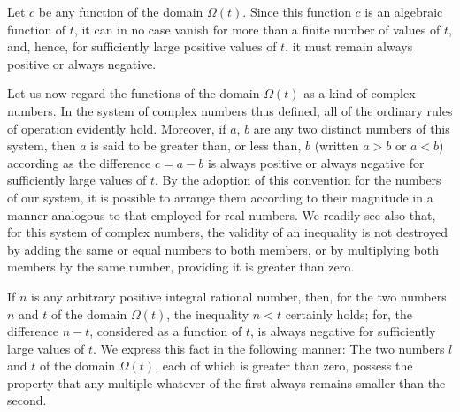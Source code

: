 \documentclass[11pt,oneside]{book}
\begin{document}
Let $c$ be any function of the domain $\Omega(t)$. Since
this function $c$ is an algebraic function of $t$, it can in
no case vanish for more than a finite number of values
of $t$, and, hence, for sufficiently large positive values of
$t$, it must remain always positive or always negative.

Let us now regard the functions of the domain
$\Omega(t)$ as a kind of complex numbers. In the system of
complex numbers thus defined, all of the ordinary
rules of operation evidently hold. Moreover, if $a$, $b$
are any two distinct numbers of this system, then $a$
is said to be greater than, or less than, $b$ (written $a>b$
or $a<b$) according as the difference $c = a-b$ is always
positive or always negative for sufficiently large values
of $t$. By the adoption of this convention for the numbers
of our system, it is possible to arrange them according
to their magnitude in a manner analogous to
that employed for real numbers. We readily see also
that, for this system of complex numbers, the validity
of an inequality is not destroyed by adding the same
or equal numbers to both members, or by multiplying
both members by the same number, providing it is
greater than zero.

If $n$ is any arbitrary positive integral rational number,
then, for the two numbers $n$ and $t$ of the domain
$\Omega (t)$, the inequality $n<t$ certainly holds; for,
the difference $n-t$, considered as a function of $t$, is always
negative for sufficiently large values of $t$. We express
this fact in the following manner: The two numbers
$l$ and $t$ of the domain $\Omega (t)$, each of which is greater
than zero, possess the property that any multiple
whatever of the first always remains smaller than the
second.
\end{document}
